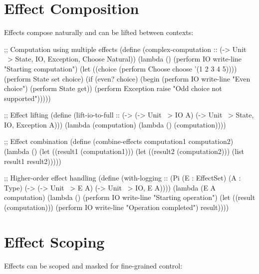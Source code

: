 \section{Effect Composition}
\label{sec:effect-composition}


Effects compose naturally and can be lifted between contexts:

\begin{example}
\begin{lambdustcode}
;; Computation using multiple effects
(define (complex-computation :: (-> Unit ~> {State, IO, Exception, Choose} Natural))
  (lambda ()
    (perform IO write-line "Starting computation")
    (let ((choice (perform Choose choose '(1 2 3 4 5))))
      (perform State set choice)
      (if (even? choice)
          (begin 
            (perform IO write-line "Even choice")
            (perform State get))
          (perform Exception raise "Odd choice not supported")))))

;; Effect lifting  
(define (lift-io-to-full :: (-> (-> Unit ~> {IO} A) (-> Unit ~> {State, IO, Exception} A)))
  (lambda (computation)
    (lambda () (computation))))

;; Effect combination
(define (combine-effects computation1 computation2)
  (lambda ()
    (let ((result1 (computation1)))
      (let ((result2 (computation2)))
        (list result1 result2)))))

;; Higher-order effect handling
(define (with-logging :: (Pi (E : EffectSet) (A : Type)
                            (-> (-> Unit ~> E A) (-> Unit ~> {IO, E} A))))
  (lambda (E A computation)
    (lambda () 
      (perform IO write-line "Starting operation")
      (let ((result (computation)))
        (perform IO write-line "Operation completed") 
        result))))
\end{lambdustcode}
\end{example}

\section{Effect Scoping}
\label{sec:effect-scoping}


Effects can be scoped and masked for fine-grained control:

